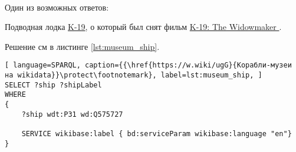 \begin{task}
	\label{answer:ship_ex_2}
	\\

	Один из возможных ответов:\\
	{
		\setlength{\fboxsep}{0pt}%
		\setlength{\fboxrule}{1pt}%
	}

	Подводная лодка \href{https://ru.wikipedia.org/wiki/К-19}{K-19}, о который был снят фильм \href{https://en.wikipedia.org/wiki/K-19:_The_Widowmaker}{K-19: The Widowmaker
	}.

\end{task}


\begin{task}
	\label{answer:ship_ex_3}

	Решение см в листинге \ref{lst:museum_ship}.

	\begin{lstlisting}[ language=SPARQL, caption={{\href{https://w.wiki/ugG}{Корабли-музеи на wikidata}}\protect\footnotemark}, label=lst:museum_ship, ]
SELECT ?ship ?shipLabel
WHERE
{
	?ship wdt:P31 wd:Q575727
			   
	SERVICE wikibase:label { bd:serviceParam wikibase:language "en"}
}
	\end{lstlisting}
		

\end{task}